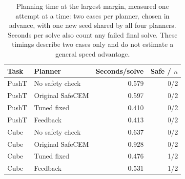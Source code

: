 \begin{table}[t]
\caption{Planning time at the largest margin, measured one attempt at a
time: two cases per planner, chosen in advance, with one new seed shared by
all four planners. Seconds per solve also count any failed final solve.
These timings describe two cases only and do not estimate a general speed
advantage.}
\label{tab:extension-time}\centering\small
\begin{tabular}{llrr}\toprule
Task & Planner & Seconds/solve & Safe / $n$ \\ \midrule
PushT & No safety check & 0.579 & 0/2 \\
PushT & Original SafeCEM & 0.597 & 0/2 \\
PushT & Tuned fixed & 0.410 & 0/2 \\
PushT & Feedback & 0.413 & 0/2 \\
Cube & No safety check & 0.637 & 0/2 \\
Cube & Original SafeCEM & 0.928 & 0/2 \\
Cube & Tuned fixed & 0.476 & 1/2 \\
Cube & Feedback & 0.531 & 1/2 \\
\bottomrule\end{tabular}
\end{table}


